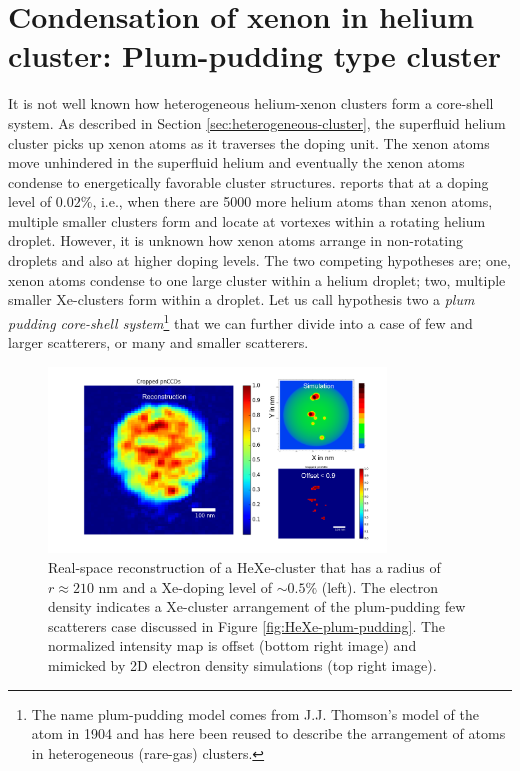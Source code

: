 \section{Condensation of xenon in helium cluster: Plum-pudding type cluster}\label{sec:helium-data}
It is not well known how heterogeneous helium-xenon clusters form a core-shell system. As described in Section \ref{sec:heterogeneous-cluster}, the superfluid helium cluster picks up xenon atoms as it traverses the doping unit. The xenon atoms move unhindered in the superfluid helium and eventually the xenon atoms condense to energetically favorable cluster structures. \citep{Gomez-2014-Science} reports that at a doping level of $0.02\%$, i.e., when there are 5000 more helium atoms than xenon atoms, multiple smaller clusters form and locate at vortexes within a rotating helium droplet. However, it is unknown how xenon atoms arrange in non-rotating droplets and also at higher doping levels. The two competing hypotheses are; one, xenon atoms condense to one large cluster within a helium droplet; two, multiple smaller Xe-clusters form within a droplet. Let us call hypothesis two a \textit{plum pudding core-shell system}\footnote{The name plum-pudding model comes from J.J. Thomson's model of the atom in 1904 and has here been reused to describe the arrangement of atoms in heterogeneous (rare-gas) clusters.} that we can further divide into a case of few and larger scatterers, or many and smaller scatterers.\\[1\baselineskip]
\begin{figure}
 	\centering
 		\includegraphics[width=0.80\textwidth]{images/results/reconstructions-to-simulations.png}
 	\caption[Reconstruction of HeXe-clusters and simulated electron densities.]{Real-space reconstruction of a HeXe-cluster that has a radius of $r\approx 210$ nm and a Xe-doping level of $\sim 0.5\%$ (left). The electron density indicates a Xe-cluster arrangement of the plum-pudding few scatterers case discussed in Figure \ref{fig:HeXe-plum-pudding}. The normalized intensity map is offset (bottom right image) and mimicked by 2D electron density simulations (top right image).}
 	\label{fig:HeXe-cluster-60}
\end{figure}
